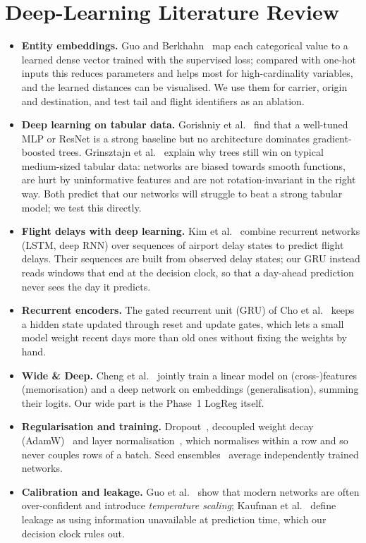 \documentclass[conference]{IEEEtran}
\begin{document}
\section{Deep-Learning Literature Review}\label{sec:related}
\begin{itemize}
\item \textbf{Entity embeddings.} Guo and Berkhahn~\cite{guo2016entity} map each categorical value to a learned dense vector trained with the supervised loss; compared with one-hot inputs this reduces parameters and helps most for high-cardinality variables, and the learned distances can be visualised. We use them for carrier, origin and destination, and test tail and flight identifiers as an ablation.
\item \textbf{Deep learning on tabular data.} Gorishniy et al.~\cite{gorishniy2021revisiting} find that a well-tuned MLP or ResNet is a strong baseline but no architecture dominates gradient-boosted trees. Grinsztajn et al.~\cite{grinsztajn2022tree} explain why trees still win on typical medium-sized tabular data: networks are biased towards smooth functions, are hurt by uninformative features and are not rotation-invariant in the right way. Both predict that our networks will struggle to beat a strong tabular model; we test this directly.
\item \textbf{Flight delays with deep learning.} Kim et al.~\cite{kim2016deep} combine recurrent networks (LSTM, deep RNN) over sequences of airport delay states to predict flight delays. Their sequences are built from observed delay states; our GRU instead reads windows that end at the decision clock, so that a day-ahead prediction never sees the day it predicts.
\item \textbf{Recurrent encoders.} The gated recurrent unit (GRU) of Cho et al.~\cite{cho2014gru} keeps a hidden state updated through reset and update gates, which lets a small model weight recent days more than old ones without fixing the weights by hand.
\item \textbf{Wide \& Deep.} Cheng et al.~\cite{cheng2016wide} jointly train a linear model on (cross-)features (memorisation) and a deep network on embeddings (generalisation), summing their logits. Our wide part is the Phase~1 LogReg itself.
\item \textbf{Regularisation and training.} Dropout~\cite{srivastava2014dropout}, decoupled weight decay (AdamW)~\cite{loshchilov2019adamw} and layer normalisation~\cite{ba2016layernorm}, which normalises within a row and so never couples rows of a batch. Seed ensembles~\cite{lakshminarayanan2017ensembles} average independently trained networks.
\item \textbf{Calibration and leakage.} Guo et al.~\cite{guo2017calibration} show that modern networks are often over-confident and introduce \emph{temperature scaling}; Kaufman et al.~\cite{kaufman2012leakage} define leakage as using information unavailable at prediction time, which our decision clock rules out.
\end{itemize}
\end{document}
